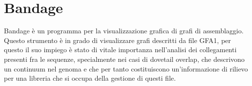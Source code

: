 \section{Bandage}
\nocite{doi:10.1093/bioinformatics/btv383}
Bandage è un programma per la visualizzazione grafica di grafi
di assemblaggio. Questo strumento è in grado di visualizzare
grafi descritti da file GFA1, per questo il suo impiego
è stato di vitale importanza nell'analisi dei collegamenti presenti fra
le sequenze, specialmente nei casi di dovetail overlap, che descrivono
un continuum nel genoma e che per tanto costituiscono un'informazione
di rilievo per una libreria che si occupa della gestione di questi file.

